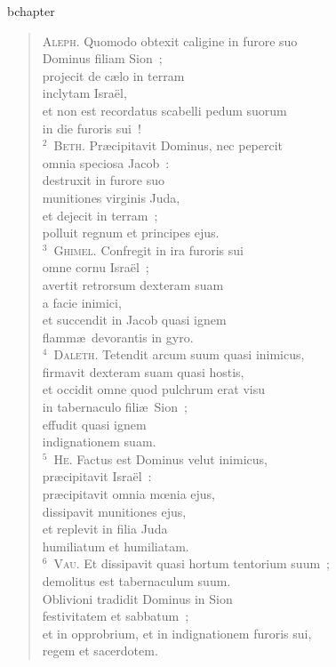 bchapter\begin{flushleft}\begin{verse}\vspace{-19pt}\textsc{Aleph.} Quomodo obtexit caligine in furore suo\\ Dominus filiam Sion~;\\ projecit de c\ae lo in terram\\ inclytam Isra\"el,\\ et non est recordatus scabelli pedum suorum\\ in die furoris sui~!\\
${}^{2}$~\textsc{Beth.} Pr\ae cipitavit Dominus, nec pepercit\\ omnia speciosa Jacob~:\\ destruxit in furore suo\\ munitiones virginis Juda,\\ et dejecit in terram~;\\ polluit regnum et principes ejus.\\
${}^{3}$~\textsc{Ghimel.} Confregit in ira furoris sui\\ omne cornu Isra\"el~;\\ avertit retrorsum dexteram suam\\ a facie inimici,\\ et succendit in Jacob quasi ignem\\ flamm\ae\ devorantis in gyro.\\
${}^{4}$~\textsc{Daleth.} Tetendit arcum suum quasi inimicus,\\ firmavit dexteram suam quasi hostis,\\ et occidit omne quod pulchrum erat visu\\ in tabernaculo fili\ae\ Sion~;\\ effudit quasi ignem\\ indignationem suam.\\
${}^{5}$~\textsc{He.} Factus est Dominus velut inimicus,\\ pr\ae cipitavit Isra\"el~:\\ pr\ae cipitavit omnia mœnia ejus,\\ dissipavit munitiones ejus,\\ et replevit in filia Juda\\ humiliatum et humiliatam.\\
${}^{6}$~\textsc{Vau.} Et dissipavit quasi hortum tentorium suum~;\\ demolitus est tabernaculum suum.\\ Oblivioni tradidit Dominus in Sion\\ festivitatem et sabbatum~;\\ et in opprobrium, et in indignationem furoris sui,\\ regem et sacerdotem.\\

\end{verse}
\end{flushleft}
